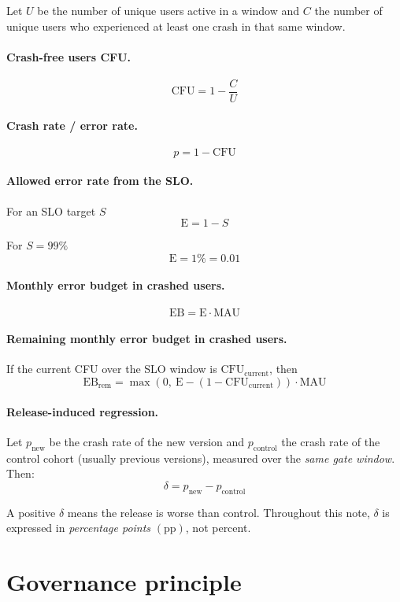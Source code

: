 \documentclass{article}
\newcommand{\CFU}{\mathrm{CFU}}
\newcommand{\MAU}{\mathrm{MAU}}
\newcommand{\EB}{\mathrm{EB}}
\newcommand{\E}{\mathrm{E}}
\newcommand{\pp}{\text{pp}}
\begin{document}
Let $U$ be the number of unique users active in a window and $C$ the number of unique users who experienced at least one crash in that same window.

\paragraph{Crash-free users CFU.}

\[
\CFU = 1 - \frac{C}{U}
\]

\paragraph{Crash rate / error rate.}
\[
p = 1 - \CFU
\]

\paragraph{Allowed error rate from the SLO.}
For an SLO target $S$
\[
\E = 1 - S
\]

For $S = 99\%$
\[
\E = 1\% = 0.01
\]

\paragraph{Monthly error budget in crashed users.}
\[
\EB = \E \cdot \MAU
\]

\paragraph{Remaining monthly error budget in crashed users.}
If the current CFU over the SLO window is $\CFU_{\mathrm{current}}$, then
\[
\EB_{\mathrm{rem}} = 
\max(0,\ \E - (1 - \CFU_{\mathrm{current}})) \cdot \MAU
\]

\paragraph{Release-induced regression.} 
Let $p_{\mathrm{new}}$ be the crash rate of the new version and $p_{\mathrm{control}}$ the crash rate of the control cohort (usually previous versions), measured over the \emph{same gate window}. 
Then:
\[
\delta = p_{\mathrm{new}} - p_{\mathrm{control}}
\]

A positive $\delta$ means the release is worse than control.
Throughout this note, $\delta$ is expressed in \emph{percentage points} $(\pp)$, not percent.

\section{Governance principle}
\end{document}

